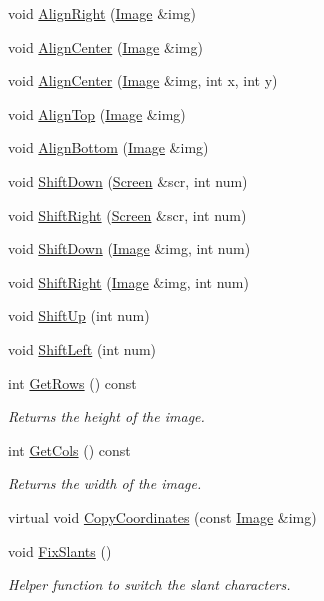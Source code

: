 \begin{DoxyCompactItemize}
void \hyperlink{classImage_a171b44f5d1ac53bfa9984a87c9786dd1}{Align\-Right} (\hyperlink{classImage}{Image} \&img)
\item 
void \hyperlink{classImage_a7471581b8a028a79fd87d741ae825e23}{Align\-Center} (\hyperlink{classImage}{Image} \&img)
\item 
void \hyperlink{classImage_a4607fa422c54fb4bf0412edd47214b40}{Align\-Center} (\hyperlink{classImage}{Image} \&img, int x, int y)
\item 
void \hyperlink{classImage_a12f3de115677e508268f5b7d3485b483}{Align\-Top} (\hyperlink{classImage}{Image} \&img)
\item 
void \hyperlink{classImage_a1bb0179923b51be9159fbd74b6f4f91f}{Align\-Bottom} (\hyperlink{classImage}{Image} \&img)
\item 
void \hyperlink{classImage_aed099dcc3c5113b7171daa35460df948}{Shift\-Down} (\hyperlink{classScreen}{Screen} \&scr, int num)
\item 
void \hyperlink{classImage_a1dc60415fb8f71c1c9345382be4ee32f}{Shift\-Right} (\hyperlink{classScreen}{Screen} \&scr, int num)
\item 
void \hyperlink{classImage_ad3fec1f163c82a6dc376e1727e42de30}{Shift\-Down} (\hyperlink{classImage}{Image} \&img, int num)
\item 
void \hyperlink{classImage_ae905765bb51e09a8252dcb157b2bcf28}{Shift\-Right} (\hyperlink{classImage}{Image} \&img, int num)
\item 
void \hyperlink{classImage_a8b15a9bbf2a56bd2105bbc1114bba173}{Shift\-Up} (int num)
\item 
void \hyperlink{classImage_a1bc3f79eeff5bfcc430299cb149071f5}{Shift\-Left} (int num)
\item 
int \hyperlink{classImage_a91b5bb5c3fef2795ec9838763536ed78}{Get\-Rows} () const 
\begin{DoxyCompactList}\small\item\em Returns the height of the image. \end{DoxyCompactList}\item 
int \hyperlink{classImage_a5377ce45ff29db084776e675b413f165}{Get\-Cols} () const 
\begin{DoxyCompactList}\small\item\em Returns the width of the image. \end{DoxyCompactList}\item 
virtual void \hyperlink{classImage_ada292cfbe131d1e84a9f6aaddc22064b}{Copy\-Coordinates} (const \hyperlink{classImage}{Image} \&img)
\item 
void \hyperlink{classImage_a5c723d560bde4b6aa45f3eaa36ffb4f2}{Fix\-Slants} ()
\begin{DoxyCompactList}\small\item\em Helper function to switch the slant characters. \end{DoxyCompactList}\end{DoxyCompactItemize}
